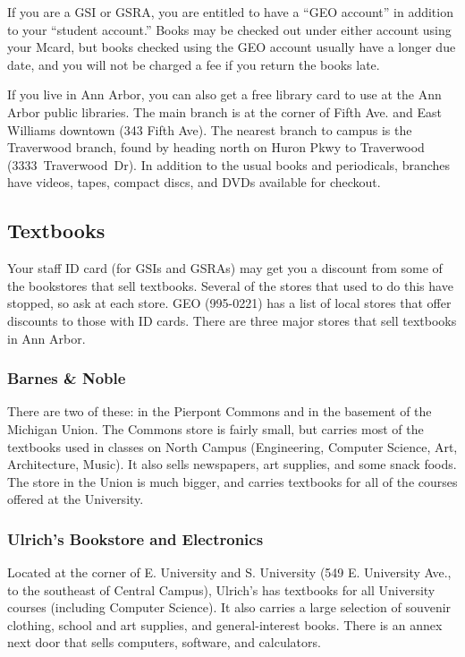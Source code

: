 \documentclass[11pt]{article}
\begin{document}
If you are a GSI or GSRA, you are entitled to have a “GEO account” in
addition to your “student account.”  Books may be checked out under
either account using your Mcard, but books checked using the GEO
account usually have a longer due date, and you will not be charged a
fee if you return the books late.

If you live in Ann Arbor, you can also get a free library card to use
at the Ann Arbor public libraries.  The main branch is at the corner
of Fifth Ave. and East Williams downtown (343 Fifth Ave).  The nearest
branch to campus is the Traverwood branch, found by heading north on
Huron Pkwy to Traverwood (3333 Traverwood Dr).  In addition to the
usual books and periodicals, branches have videos, tapes, compact
discs, and DVDs available for checkout.
\subsection{Textbooks}
\label{sec-8_2}

Your staff ID card (for GSIs and GSRAs) may get you a discount from some of the bookstores that sell textbooks.  Several of the stores that used to do this have stopped, so ask at each store.  GEO (995-0221) has a list of local stores that offer discounts to those with ID cards.  There are three major stores that sell textbooks in Ann Arbor.
\subsubsection{Barnes \& Noble}
\label{sec-8_2_1}

There are two of these: in the Pierpont Commons and in the basement of the Michigan Union.  The Commons store is fairly small, but carries most of the textbooks used in classes on North Campus (Engineering, Computer Science, Art, Architecture, Music).  It also sells newspapers, art supplies, and some snack foods. The store in the Union is much bigger, and carries textbooks for all of the courses offered at the University.
\subsubsection{Ulrich’s Bookstore and Electronics}
\label{sec-8_2_2}

Located at the corner of E. University and S. University (549 E. University Ave., to the southeast of Central Campus), Ulrich’s has textbooks for all University courses (including Computer Science). It also carries a large selection of souvenir clothing, school and art supplies, and general-interest books. There is an annex next door that sells computers, software, and calculators.
\end{document}
